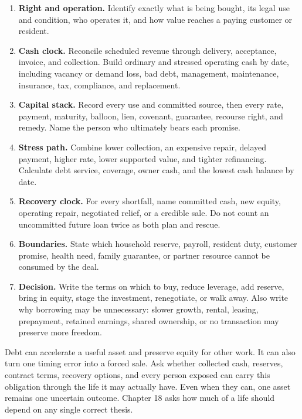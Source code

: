 \begin{enumerate}[itemsep=0.12em]
\item \textbf{Right and operation.} Identify exactly what is being bought, its
  legal use and condition, who operates it, and how value reaches a paying
  customer or resident.
\item \textbf{Cash clock.} Reconcile scheduled revenue through delivery,
  acceptance, invoice, and collection. Build ordinary and stressed operating
  cash by date, including vacancy or demand loss, bad debt, management,
  maintenance, insurance, tax, compliance, and replacement.
\item \textbf{Capital stack.} Record every use and committed source, then every
  rate, payment, maturity, balloon, lien, covenant, guarantee, recourse right,
  and remedy. Name the person who ultimately bears each promise.
\item \textbf{Stress path.} Combine lower collection, an expensive repair,
  delayed payment, higher rate, lower supported value, and tighter refinancing.
  Calculate debt service, coverage, owner cash, and the lowest cash balance by
  date.
\item \textbf{Recovery clock.} For every shortfall, name committed cash, new
  equity, operating repair, negotiated relief, or a credible sale. Do not count
  an uncommitted future loan twice as both plan and rescue.
\item \textbf{Boundaries.} State which household reserve, payroll, resident
  duty, customer promise, health need, family guarantee, or partner resource
  cannot be consumed by the deal.
\item \textbf{Decision.} Write the terms on which to buy, reduce leverage, add
  reserve, bring in equity, stage the investment, renegotiate, or walk away.
  Also write why borrowing may be unnecessary: slower growth, rental, leasing,
  prepayment, retained earnings, shared ownership, or no transaction may
  preserve more freedom.
\end{enumerate}

Debt can accelerate a useful asset and preserve equity for other work. It can
also turn one timing error into a forced sale. Ask whether collected cash,
reserves, contract terms, recovery options, and every person exposed can carry
this obligation through the life it may actually have. Even when they can, one
asset remains one uncertain outcome. Chapter 18 asks how much of a life should
depend on any single correct thesis.
